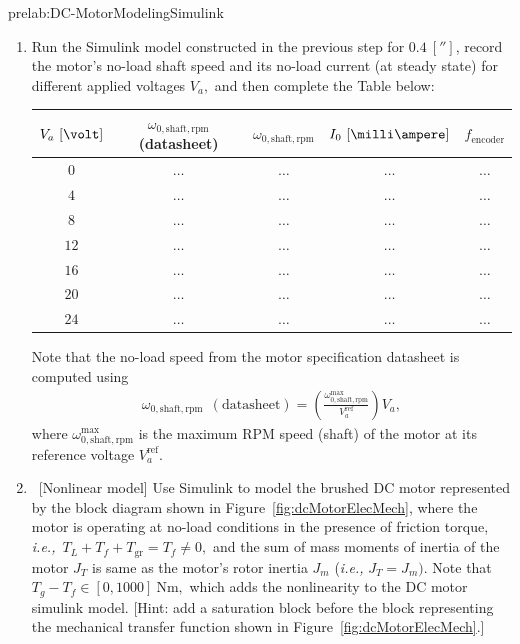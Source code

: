 \begin{prelab}{prelab:DC-MotorModelingSimulink}
\begin{enumerate}
\item Run the Simulink model constructed in the previous step for $0.4~[\second]$, record the motor's no-load shaft speed and its no-load current (at steady state) for different applied voltages $V_a,$ and then complete the Table below: %
%
  \begin{center}
    \begin{tabular}{c|c|c|c|c}
      \toprule
      $V_a~[\volt]$ &$\omega_{0,\mathrm{shaft,rpm}}$ (datasheet) &  $\omega_{0,\mathrm{shaft,rpm}}$ & $I_0~[\milli\ampere]$ & $f_{\mathrm{encoder}}$\\
      \toprule
      $0$ & $\ldots$ & $\ldots$& $\ldots$ & $\ldots$\\
      $4$ & $\ldots$ & $\ldots$& $\ldots$ & $\ldots$\\
      $8$ & $\ldots$ & $\ldots$& $\ldots$ & $\ldots$\\
      $12$ & $\ldots$ & $\ldots$& $\ldots$ & $\ldots$\\
      $16$ & $\ldots$ & $\ldots$& $\ldots$ & $\ldots$\\
      $20$ & $\ldots$ & $\ldots$& $\ldots$ & $\ldots$\\
      $24$ & $\ldots$ & $\ldots$& $\ldots$ & $\ldots$\\
      \bottomrule
    \end{tabular}    
  \end{center}  
  Note that the no-load speed from the motor specification datasheet is computed using %
  \begin{align}
    \omega_{0,\mathrm{shaft,rpm}}~~\mathrm{(datasheet)} = \left(\frac{\omega_{0,\mathrm{shaft,rpm}}^{\mathrm{max}}}{V_a^{\mathrm{ref}}}\right)V_a,
  \end{align}
  where $\omega_{0,\mathrm{shaft,rpm}}^{\mathrm{max}}$ is the maximum RPM speed (shaft) of the motor at its reference voltage $V_a^{\mathrm{ref}}.$ 

\item ~[Nonlinear model] Use Simulink to model the brushed DC motor represented by the block diagram shown in Figure~\ref{fig:dcMotorElecMech}, where the motor is operating at no-load conditions in the presence of friction torque, \textit{i.e.,~}$T_L + T_f +T_{\mathrm{gr}} = T_f\ne 0,$ and the sum of mass moments of inertia of the motor $J_T$ is same as the motor's rotor inertia $J_m$ (\textit{i.e.,} $J_T=J_m).$ Note that $T_g-T_f\in[0,1000]~\si{\newton\meter},$ which adds the  nonlinearity to the DC motor simulink model. [Hint: add a saturation block before the block representing the mechanical transfer function shown in Figure~\ref{fig:dcMotorElecMech}.]
  

\end{enumerate}
\end{prelab}
